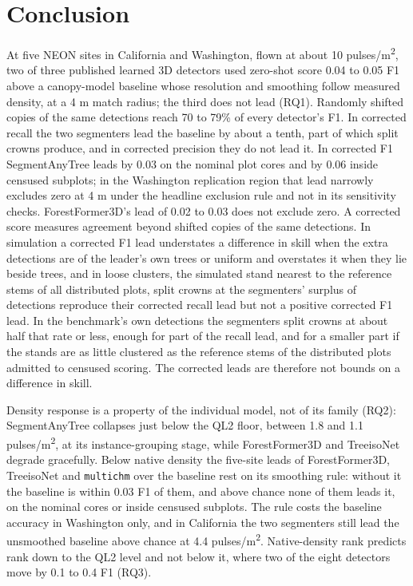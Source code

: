 \documentclass[journal]{IEEEtran}
\begin{document}
\section{Conclusion}\label{sec:7}

At five NEON sites in California and Washington, flown at about 10 pulses/m\textsuperscript{2},
two of three published learned 3D detectors used zero-shot score 0.04 to 0.05 F1
above a canopy-model baseline whose resolution and smoothing follow measured
density, at a 4 m match radius; the third does not lead (RQ1). Randomly shifted
copies of the same detections reach 70 to 79\% of every detector's F1. In
corrected recall the two segmenters lead the baseline by about a tenth, part of
which split crowns produce, and in corrected precision they do not lead it. In
corrected F1 SegmentAnyTree leads by 0.03 on the nominal plot cores and by 0.06
inside censused subplots; in the Washington replication region that lead
narrowly excludes zero at 4 m under the headline exclusion rule and not in its
sensitivity checks. ForestFormer3D's lead of 0.02 to 0.03 does not exclude zero.
A corrected score measures agreement beyond shifted copies of the same
detections. In simulation a corrected F1 lead understates a difference in skill
when the extra detections are of the leader's own trees or uniform and
overstates it when they lie beside trees, and in loose clusters, the simulated
stand nearest to the reference stems of all distributed plots, split crowns at
the segmenters' surplus of detections reproduce their corrected recall lead but
not a positive corrected F1 lead. In the benchmark's own detections the
segmenters split crowns at about half that rate or less, enough for part of the
recall lead, and for a smaller part if the stands are as little clustered as the
reference stems of the distributed plots admitted to censused scoring. The
corrected leads are therefore not bounds on a difference in skill.

Density response is a property of the individual model, not of its family (RQ2):
SegmentAnyTree collapses just below the QL2 floor, between 1.8 and 1.1
pulses/m\textsuperscript{2}, at its instance-grouping stage, while ForestFormer3D and TreeisoNet
degrade gracefully. Below native density the five-site leads of ForestFormer3D,
TreeisoNet and \texttt{multichm} over the baseline rest on its smoothing rule: without
it the baseline is within 0.03 F1 of them, and above chance none of them leads
it, on the nominal cores or inside censused subplots. The rule costs the
baseline accuracy in Washington only, and in California the two segmenters still
lead the unsmoothed baseline above chance at 4.4 pulses/m\textsuperscript{2}. Native-density rank
predicts rank down to the QL2 level and not below it, where two of the eight
detectors move by 0.1 to 0.4 F1 (RQ3).
\end{document}
